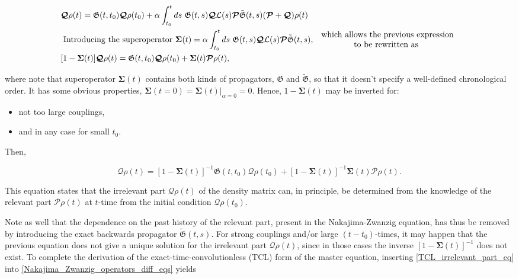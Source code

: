 \documentclass{homework}
\begin{document}
\begin{equation}
\begin{split}
    &\bm{\mathcal{Q}}\rho(t) = \mathfrak{G}(t,t_0) \bm{\mathcal{Q}}\rho(t_0) + \alpha \int_{t_0}^t ds \textnormal{ } \mathfrak{G}(t,s) \bm{\mathcal{Q}} \mathcal{L}(s) \bm{\mathcal{P}}\tilde{\mathfrak{G}}(t,s) (\bm{\mathcal{P}} + \bm{\mathcal{Q}}) \rho(t) \\
    &\textnormal{ Introducing the superoperator } \bm{\Sigma}(t) = \alpha \int_{t_0}^{t} ds \textnormal{ } \mathfrak{G}(t,s) \bm{\mathcal{Q}} \mathcal{L}(s) \bm{\mathcal{P}} \tilde{\mathfrak{G}}(t,s),
\begin{array}{cc}
     \textnormal{ which allows the previous expression}  \\
     \textnormal{ to be rewritten as } 
\end{array} \\
    & [1- \bm{\Sigma}(t)]\bm{\mathcal{Q}}\rho(t) = \mathfrak{G}(t,t_0) \bm{\mathcal{Q}}\rho(t_0) + \bm{\Sigma}(t) \bm{\mathcal{P}}\rho(t),
\end{split}
\end{equation}

where note that superoperator $\bm{\Sigma}(t)$ contains both kinds of propagators, $\mathfrak{G}$ and $\tilde{\mathfrak{G}}$, so that it doesn't specify a well-defined chronological order. It has some obvious properties, $\bm{\Sigma}(t = 0) = \bm{\Sigma}(t)\bigg|_{\alpha = 0} = 0$. Hence, $1 - \bm{\Sigma}(t)$ may be inverted for:

\begin{itemize}
    \item not too large couplings,
    \item and in any case for small $t_0$. 
\end{itemize}

Then, 

\begin{equation}
    \bm{\mathcal{Q}}\rho(t) = [1-\bm{\Sigma}(t)]^{-1} \mathfrak{G}(t,t_0) \bm{\mathcal{Q}}\rho(t_0) + [1-\bm{\Sigma}(t)]^{-1}  \bm{\Sigma}(t) \bm{\mathcal{P}}\rho(t). 
    \label{TCL_irrelevant_part_eq}
\end{equation}

This equation states that the irrelevant part $\bm{\mathcal{Q}}\rho(t)$ of the density matrix can, in principle, be determined from the knowledge of the relevant part $\bm{\mathcal{P}}\rho(t)$ at $t$-time from the initial condition $\bm{\mathcal{Q}}\rho(t_0)$.

Note as well that the dependence on the past history of the relevant part, present in the Nakajima-Zwanzig equation, has thus be removed by introducing the exact backwards propagator $\tilde{\mathfrak{G}}(t,s)$. For strong couplings and/or large $(t-t_0)$-times, it may happen that the previous equation does not give a unique solution for the irrelevant part $\bm{\mathcal{Q}}\rho(t)$, since in those cases the inverse $[1-\bm{\Sigma}(t)]^{-1}$ does not exist. To complete the derivation of the exact-time-convolutionless (TCL) form of the master equation, inserting  \cref{TCL_irrelevant_part_eq} into \cref{Nakajima_Zwanzig_operators_diff_eqs} yields 
\end{document}

